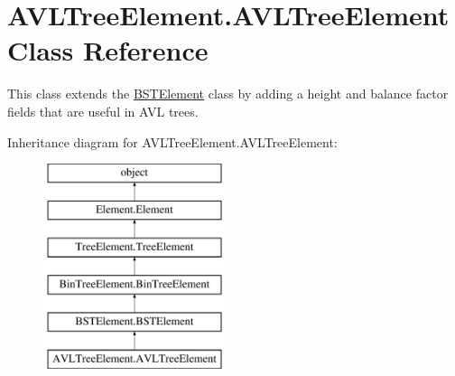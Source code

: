 \hypertarget{class_a_v_l_tree_element_1_1_a_v_l_tree_element}{}\section{A\+V\+L\+Tree\+Element.\+A\+V\+L\+Tree\+Element Class Reference}
\label{class_a_v_l_tree_element_1_1_a_v_l_tree_element}


This class extends the \hyperlink{namespace_b_s_t_element}{B\+S\+T\+Element} class by adding a height and balance factor fields that are useful in A\+V\+L trees.  


Inheritance diagram for A\+V\+L\+Tree\+Element.\+A\+V\+L\+Tree\+Element\+:\begin{figure}[H]
\begin{center}
\leavevmode
\includegraphics[height=6.000000cm]{class_a_v_l_tree_element_1_1_a_v_l_tree_element}
\end{center}
\end{figure}
